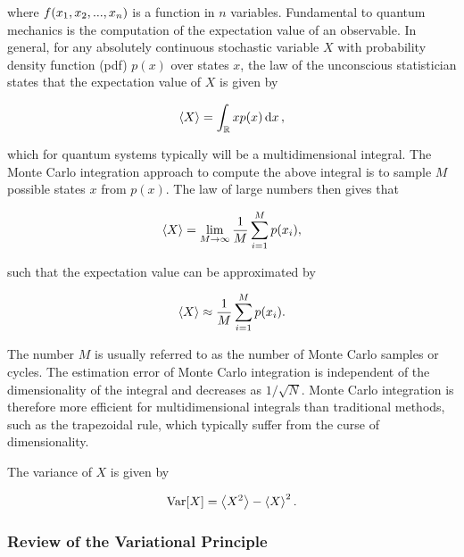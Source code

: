 where $f \qty(x_1, x_2, ..., x_n)$ is a function in $n$ variables. Fundamental to quantum mechanics is the computation of the expectation value of an observable. In general, for any absolutely continuous stochastic variable $X$ with probability density function (pdf) $p(x)$ over states $x$, the law of the unconscious statistician states that the expectation value of $X$ is given by 

\begin{equation}\label{eq:general_expval}
    \expval{X} = \int_{\mathbb{R}} x p (x) \dd{x},
\end{equation}

which for quantum systems typically will be a multidimensional integral. The Monte Carlo integration approach to compute the above integral is to sample $M$ possible states $x$ from $p(x)$. The law of large numbers then gives that 

\begin{equation*}
    \expval{X} = \lim_{M \to \infty} \frac{1}{M} \sum_{i=1}^M p \qty(x_i),
\end{equation*}

such that the expectation value can be approximated by

\begin{equation}\label{eq:mc_integration}
    \expval{X} \approx \frac{1}{M} \sum_{i=1}^M p \qty(x_i).
\end{equation}

The number $M$ is usually referred to as the number of Monte Carlo samples or cycles. The estimation error of Monte Carlo integration is independent of the dimensionality of the integral and decreases as $1 / \sqrt{N}$. Monte Carlo integration is therefore more efficient for multidimensional integrals than traditional methods, such as the trapezoidal rule, which typically suffer from the curse of dimensionality. 

The variance of $X$ is given by

\begin{equation}
    \mathrm{Var} \qty[X] = \expval{X^2} - \expval{X}^2.
\end{equation}


\subsubsection{Review of the Variational Principle}\label{sec:variational_principle}

